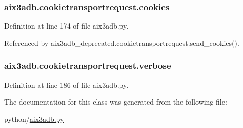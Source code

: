 \subsubsection[{cookies}]{\setlength{\rightskip}{0pt plus 5cm}aix3adb.\-cookietransportrequest.\-cookies}\label{classaix3adb_1_1cookietransportrequest_a580ba93ad6177a431eff2307bb2d93bd}


Definition at line 174 of file aix3adb.\-py.



Referenced by aix3adb\-\_\-deprecated.\-cookietransportrequest.\-send\-\_\-cookies().

\subsubsection[{verbose}]{\setlength{\rightskip}{0pt plus 5cm}aix3adb.\-cookietransportrequest.\-verbose}\label{classaix3adb_1_1cookietransportrequest_aa84359ac88f7315c9fabb150f71e5e1b}


Definition at line 186 of file aix3adb.\-py.



The documentation for this class was generated from the following file\-:\begin{DoxyCompactItemize}
\item 
python/\hyperlink{aix3adb_8py}{aix3adb.\-py}\end{DoxyCompactItemize}
